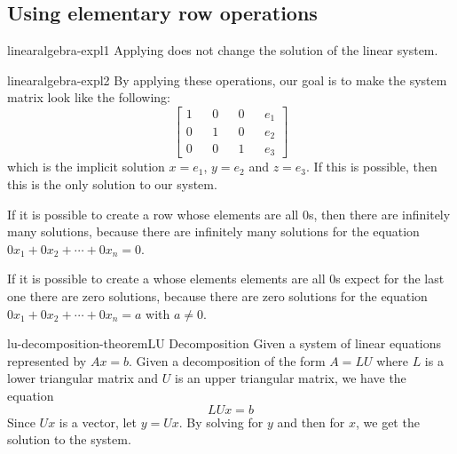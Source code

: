 \documentclass[preview]{standalone}
\begin{document}
\subsection{Using elementary row operations}

\begin{snippet}{linearalgebra-expl1}
    Applying 
    does not change the solution of the linear system.
\end{snippet}


\begin{snippet}{linearalgebra-expl2}
    By applying these operations, our goal is to make the system matrix
    look like the following:
    \[
        \begin{bmatrix} 
            1 && 0 && 0 && e_1 \\
            0 && 1 && 0 && e_2 \\
            0 && 0 && 1 && e_3
        \end{bmatrix}
    \]
    which is the implicit solution
    \(x=e_1\), \(y=e_2\) and \(z=e_3\).
    If this is possible, then this is the only solution to our system.

    \vspace{.25cm}

    If it is possible to create a row whose elements are all \(0\)s,
    then there are infinitely many solutions, because
    there are infinitely many solutions for the equation
    \(0x_1+0x_2+\cdots+0x_n = 0\).

    \vspace{.25cm}

    If it is possible to create a whose elements elements
    are all \(0\)s expect for the last one there are zero solutions,
    because there are zero solutions for the equation
    \(0x_1+0x_2+\cdots+0x_n = a\) with \(a \neq 0\).
\end{snippet}

\begin{snippettheorem}{lu-decomposition-theorem}{LU Decomposition}
    Given a system of linear equations represented by \(Ax = b\).
    Given a decomposition of the form \(A = LU\) where \(L\) is a lower triangular
    matrix and \(U\) is an upper triangular matrix, we have the equation
    \[
        LUx = b
    \]
    Since \(Ux\) is a vector, let \(y = Ux\). By solving for \(y\) and then for \(x\),
    we get the solution to the system.
\end{snippettheorem}
\end{document}
